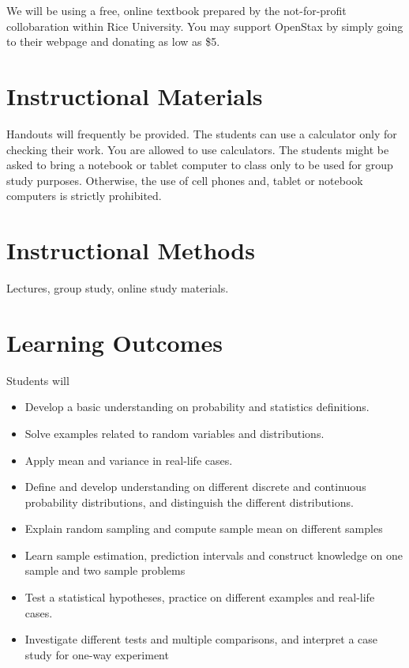 \documentclass[handout]{ximera}
\begin{document}
We will be using a free, online textbook {} prepared by the not-for-profit  collobaration within Rice University. You may support OpenStax by simply going to their webpage and donating as low as \$5.

\section*{Instructional Materials}

Handouts will frequently be provided. The students can use a calculator only for checking their work. You are allowed to use calculators.  The students might be asked to bring a notebook or tablet computer to class only to be used for group study purposes. Otherwise, the use of cell phones and, tablet or notebook computers is strictly prohibited. 

\section*{Instructional Methods}

Lectures, group study, online study materials.

\section*{Learning Outcomes}

Students will
\begin{itemize}
\item Develop a basic understanding on probability and statistics definitions.

\item Solve examples related to random variables and distributions.

\item Apply mean and variance in real-life cases.

\item Define and develop understanding on different discrete and continuous probability distributions, and distinguish the different distributions.

\item Explain random sampling and compute sample mean on different samples

\item Learn sample estimation, prediction intervals and construct knowledge on one sample and two sample problems

\item Test a statistical hypotheses, practice on different examples and real-life cases.

\item Investigate different tests and multiple comparisons, and interpret a case study for one-way experiment
\end{itemize}
\end{document}
